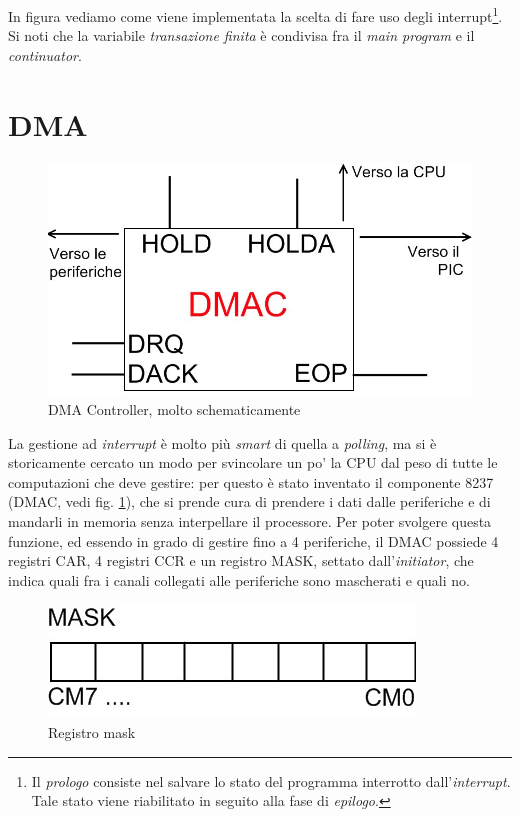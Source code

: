 In figura vediamo come viene implementata la scelta di fare uso degli interrupt\footnote{Il \textit{prologo} consiste nel salvare lo stato del programma interrotto dall'\textit{interrupt}. Tale stato viene riabilitato in seguito alla fase di \textit{epilogo}.}. Si noti che la variabile \textit{transazione finita} è condivisa fra il\textit{ main program} e il \textit{continuator}.

\section{DMA}
\label{sec:DMAPOWA}

\begin{figure}[!h]
\centering
\includegraphics[width=0.534579\columnwidth]{img/DMAC}
\caption{DMA Controller, molto schematicamente}
\label{fig:DMAC}
\end{figure}

La gestione ad \textit{interrupt} è molto più \textit{smart} di quella a \textit{polling}, ma si è storicamente cercato un modo per svincolare un po' la CPU dal peso di tutte le computazioni che deve gestire: per questo è stato inventato il componente 8237 (DMAC, vedi fig. \ref{fig:DMAC}), che si prende cura di prendere i dati dalle periferiche e di mandarli in memoria senza interpellare il processore. Per poter svolgere questa funzione, ed essendo in grado di gestire fino a 4 periferiche, il DMAC possiede 4 registri CAR, 4 registri CCR e un registro MASK, settato dall'\textit{initiator}, che indica quali fra i canali collegati alle periferiche sono mascherati e quali no.

\begin{figure}[!h]
\centering
\includegraphics[width=0.45\columnwidth]{img/mask}
\caption{Registro mask}
\label{fig:mask}
\end{figure}

